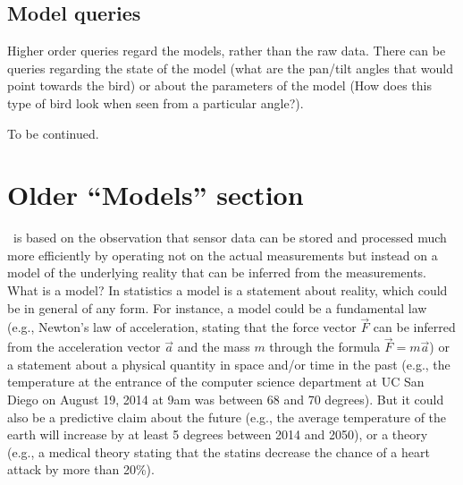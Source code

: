 \subsection{Model queries}
Higher order queries regard the models, rather than the raw
data. There can be queries regarding the state of the model (what are
the pan/tilt angles that would point towards the bird) or about the
parameters of the model (How does this type of bird look when seen
from a particular angle?).

To be continued.

\section{Older ``Models'' section} 

\projName\ is based on the observation that sensor data can be stored and processed much more efficiently by operating not on the actual measurements but instead on a model of the underlying reality that can be inferred from the measurements. What is a model? In statistics a model is a statement about reality, which could be in general of any form. For instance, a model could be a fundamental law (e.g., Newton's law of acceleration, stating that the force vector $\vec{F}$ can be inferred from the acceleration vector $\vec{a}$ and the mass $m$ through the formula $\vec{F}=m \vec{a}$) or a statement about a physical quantity in space and/or time in the past (e.g., the temperature at the entrance of the computer science department at UC San Diego on August 19, 2014 at 9am was between 68 and 70 degrees). But it could also be a predictive claim about the future (e.g., the average temperature of the earth will increase by at least 5 degrees between 2014 and 2050), or a  theory (e.g., a medical theory stating that the statins decrease the chance of a heart attack by more than 20\%).

